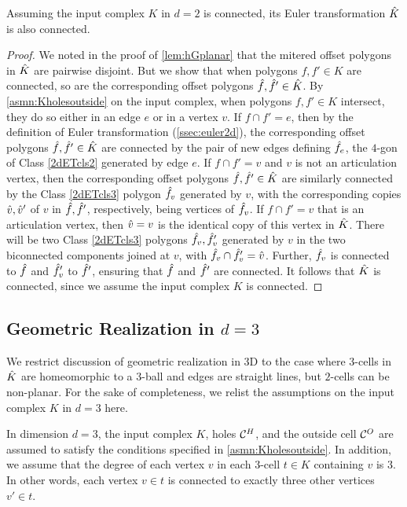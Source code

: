 \begin{prop}
  \label{prop:hKcnctd2d}
  Assuming the input complex $K$ in $d=2$ is connected, its Euler transformation $\hat{K}$ is also connected.
\end{prop}
\begin{proof}
  We noted in the proof of \cref{lem:hGplanar} that the mitered offset polygons in $\hat{K}$ are pairwise disjoint.
  But we show that when polygons $f,f' \in K$ are connected, so are the corresponding offset polygons $\hat{f}, \hat{f}' \in \hat{K}$.
  By \cref{asmn:Kholesoutside} on the input complex, when polygons $f,f' \in K$ intersect, they do so either in an edge $e$ or in a vertex $v$.
  If $f \cap f' = e$, then by the definition of Euler transformation (\cref{ssec:euler2d}), the corresponding offset polygons $\hat{f},\hat{f}' \in \hat{K}$ are connected by the pair of new edges defining $\hat{f}_e$, the $4$-gon of Class \ref{2dETcls2} generated by edge $e$.
  If $f \cap f' = v$ and $v$ is not an articulation vertex, then the corresponding offset polygons $\hat{f},\hat{f}' \in \hat{K}$ are similarly connected by the Class \ref{2dETcls3} polygon $\hat{f}_v$ generated by $v$, with the corresponding copies $\hat{v}, \hat{v}'$ of $v$ in $\hat{f},\hat{f}'$, respectively, being vertices of $\hat{f}_v$.
  If $f \cap f' = v$ that is an articulation vertex, then $\hat{v}=v$ is the identical copy of this vertex in $\hat{K}$.
  There will be two Class \ref{2dETcls3} polygons $\hat{f}_v, \hat{f}_v'$ generated by $v$ in the two biconnected components joined at $v$, with $\hat{f}_v \cap \hat{f}_v' = \hat{v}$.
  Further, $\hat{f}_v$ is connected to $\hat{f}$ and $\hat{f}_v'$ to $\hat{f}'$, ensuring that $\hat{f}$ and $\hat{f}'$ are connected.
  It follows that $\hat{K}$ is connected, since we assume the input complex $K$ is connected.
\end{proof}
\subsection{Geometric Realization in $d=3$} \label{ssec:rlzn3d}

  \vspace*{-0.3in}
  \addtocounter{thm}{-1}
  
We restrict discussion of geometric realization in 3D to the case where $3$-cells in $\hat{K}$ are homeomorphic to a $3$-ball and edges are straight lines, but $2$-cells can be non-planar.
For the sake of completeness, we relist the assumptions on the input complex $K$ in $d=3$ here.
\begin{asmn}
  \label{asmn:3dKCHCO}
  In dimension $d=3$, the input complex $K$, holes $\mathcal{C}^H$, and the outside cell $\mathcal{C}^O$ are assumed to satisfy the conditions specified in \cref{asmn:Kholesoutside}.
  In addition, we assume that the degree of each vertex $v$ in each $3$-cell $t \in K$ containing $v$ is $3$.
  In other words, each vertex $v \in t$ is connected to exactly three other vertices $v' \in t$.
\end{asmn}

